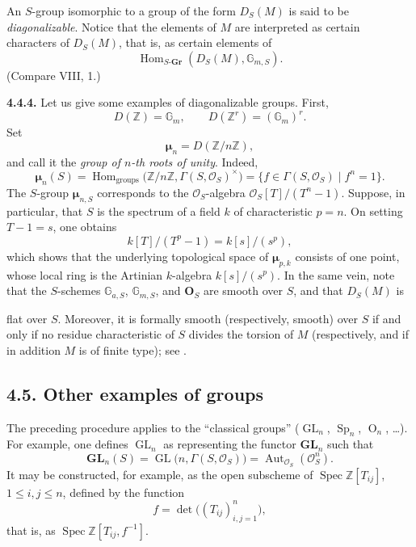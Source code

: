 An \(S\)-group isomorphic to a group of the form \(D_S(M)\) is said to
be \emph{diagonalizable}. Notice that the elements of \(M\) are
interpreted as certain characters of \(D_S(M)\), that is, as certain
elements of
\[
  \operatorname{Hom}_{S\text{-}\mathbf{Gr}}
    (D_S(M),\mathbb G_{m,S}).
\]
(Compare VIII, 1.)

\medskip
\noindent{}\textbf{4.4.4.}
Let us give some examples of diagonalizable groups. First,
\[
  D(\mathbb Z)=\mathbb G_m,
  \qquad
  D(\mathbb Z^r)=(\mathbb G_m)^r.
\]
Set
\[
  \boldsymbol\mu_n=D(\mathbb Z/n\mathbb Z),
\]
and call it the \emph{group of \(n\)-th roots of unity}. Indeed,
\[
  \boldsymbol\mu_n(S)
    =\operatorname{Hom}_{\mathrm{groups}}
       \bigl(\mathbb Z/n\mathbb Z,\Gamma(S,\mathcal O_S)^{\times}\bigr)
    =\{f\in\Gamma(S,\mathcal O_S)\mid f^n=1\}.
\]
The \(S\)-group \(\boldsymbol\mu_{n,S}\) corresponds to the
\(\mathcal O_S\)-algebra \(\mathcal O_S[T]/(T^n-1)\). Suppose, in
particular, that \(S\) is the spectrum of a field \(k\) of
characteristic \(p=n\). On setting \(T-1=s\), one obtains
\[
  k[T]/(T^p-1)=k[s]/(s^p),
\]
which shows that the underlying topological space of
\(\boldsymbol\mu_{p,k}\) consists of one point, whose local ring is the
Artinian \(k\)-algebra \(k[s]/(s^p)\). In the same vein, note that the
\(S\)-schemes \(\mathbb G_{a,S}\), \(\mathbb G_{m,S}\), and
\(\mathbf O_S\) are smooth over \(S\), and that \(D_S(M)\) is

flat over \(S\). Moreover, it is formally smooth (respectively, smooth)
over \(S\) if and only if no residue characteristic of \(S\) divides
the torsion of \(M\) (respectively, and if in addition \(M\) is of
finite type); see .

\subsection*{4.5. Other examples of groups}

The preceding procedure applies to the ``classical groups''
(\(\operatorname{GL}_n\), \(\operatorname{Sp}_n\), \(\operatorname O_n\), \ldots). For example, one defines \(\operatorname{GL}_n\) as
representing the functor \(\mathbf{GL}_n\) such that
\[
  \mathbf{GL}_n(S)
    =\operatorname{GL}\bigl(n,\Gamma(S,\mathcal O_S)\bigr)
    =\operatorname{Aut}_{\mathcal O_S}(\mathcal O_S^n).
\]
It may be constructed, for example, as the open subscheme of
\(\operatorname{Spec}\mathbb Z[T_{ij}]\), \(1\leq i,j\leq n\), defined
by the function
\[
  f=\det\bigl((T_{ij})_{i,j=1}^n\bigr),
\]
that is, as \(\operatorname{Spec}\mathbb Z[T_{ij},f^{-1}]\).

